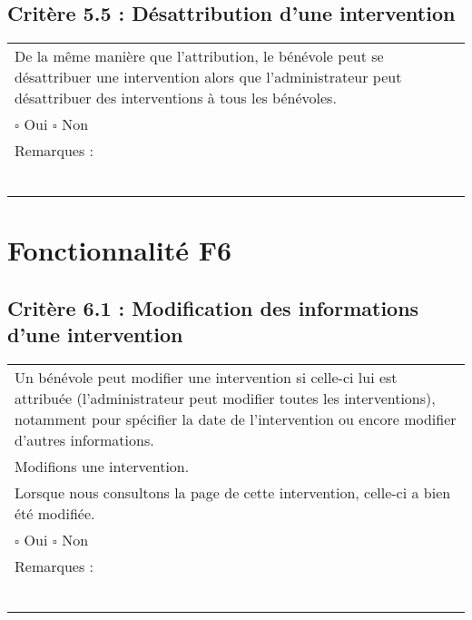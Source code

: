   	\subsection*{Critère 5.5 : Désattribution d'une intervention}
  		\begin{center}
    	 		\begin{tabular}[h]{|p{}|}
			\hline
				De la même manière que l'attribution, le bénévole peut se désattribuer une intervention alors que l'administrateur peut désattribuer des interventions à tous les bénévoles. \\
				
				$\square$ Oui  \hfill \hfill $\square$ Non \\\hline Remarques : \\ ~\\
			 \\\hline
     		\end{tabular}
  		\end{center}	
 
\section{Fonctionnalité F6}
	\subsection*{Critère 6.1 : Modification des informations d'une intervention }
  		\begin{center}
    	 		\begin{tabular}[h]{|p{}|}
			\hline
				Un bénévole peut modifier une intervention si celle-ci lui est attribuée (l'administrateur peut modifier toutes les interventions), notamment pour spécifier la date de l'intervention ou encore modifier d'autres informations. \\
				Modifions une intervention. \\
				Lorsque nous consultons la page de cette intervention, celle-ci a bien été modifiée. \\
				
				$\square$ Oui  \hfill \hfill $\square$ Non \\\hline Remarques : \\ ~\\
			 \\\hline
     		\end{tabular}
  		\end{center}	
  		
